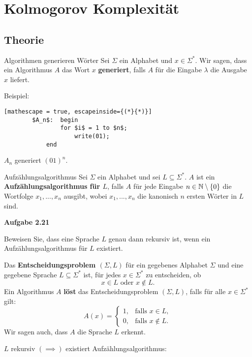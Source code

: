 \section{Kolmogorov Komplexität}
\subsection{Theorie}
    \begin{mainbox}{Algorithmen generieren Wörter}
        Sei $\Sigma$ ein Alphabet und $x \in \Sigma^*$. Wir sagen, dass ein Algorithmus $A$ das Wort $x$ \textbf{generiert}, falls $A$ für die Eingabe $\lambda$ die Ausgabe $x$ liefert.
    \end{mainbox}
    Beispiel:
    \begin{lstlisting}[mathescape = true, escapeinside={(*}{*)}]
        $A_n$: 	begin
                for $i$ = 1 to $n$;
                    write(01);
            end
       \end{lstlisting}
       $A_n$ generiert $(01)^n$.

    \begin{mainbox}{Aufzählungsalgorithmus}
        Sei $\Sigma$ ein Alphabet und sei $L \subseteq \Sigma^*$. $A$ ist ein \textbf{Aufzählungsalgorithmus für $L$}, 
        falls $A$  für jede Eingabe $n \in \mathbb{N} \setminus \{0\}$ die Wortfolge $x_1, ...,x_n$ ausgibt, wobei $x_1, ...,x_n$ die kanonisch $n$ ersten Wörter in $L$ sind.
    \end{mainbox}

    \textbf{Aufgabe 2.21}
    
    Beweisen Sie, dass eine Sprache $L$ genau dann rekursiv ist, wenn ein Aufzählungsalgorithmus für $L$ existiert.
    \begin{mainbox}{}
        Das \textbf{Entscheidungsproblem $(\Sigma, L)$} für ein gegebenes Alphabet $\Sigma$ und eine gegebene Sprache $L \subseteq \Sigma^*$ ist, für jedes $x \in \Sigma^*$ zu entscheiden, ob 
        $$x \in L \text{ oder } x \notin L.$$
        Ein Algorithmus $A$ \textbf{löst} das Entscheidungsproblem $(\Sigma, L)$, falls für alle $x \in \Sigma^*$ gilt:
        $$A(x) = \begin{cases}
            1, &\text{falls }x \in L,\\
            0, &\text{falls }x \notin L.
        \end{cases}$$
        Wir sagen auch, dass $A$ die Sprache $L$ erkennt.
    \end{mainbox}

    $L$ rekursiv $(\implies)$ existiert Aufzählungsalgorithmus:


